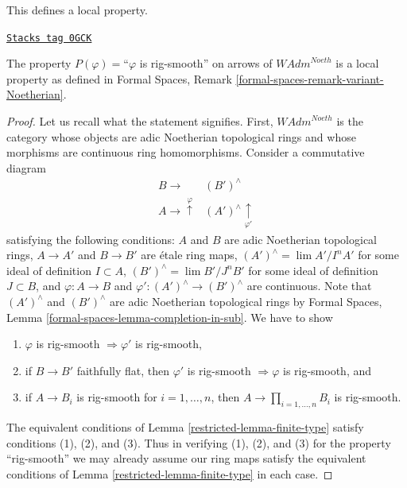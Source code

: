 This defines a local property.

\begin{lemma}
\label{restricted-lemma-rig-smooth-axioms}
\href{https://stacks.math.columbia.edu/tag/0GCK}{\texttt{Stacks tag 0GCK}}

The property $P(\varphi)=$``$\varphi$ is rig-smooth'' on arrows
of $\textit{WAdm}^{Noeth}$ is a local property as defined in
Formal Spaces, Remark \ref{formal-spaces-remark-variant-Noetherian}.
\end{lemma}

\begin{proof}

Let us recall what the statement signifies. First,
$\textit{WAdm}^{Noeth}$ is the category whose objects are
adic Noetherian topological rings and whose morphisms are
continuous ring homomorphisms. Consider a commutative diagram
$$
\begin{array}{cc}B \longrightarrow & (B')^\wedge \\ A \longrightarrow\overset{\varphi}{\uparrow} & (A')^\wedge \underset{\varphi'}{\uparrow}\end{array}
$$
satisfying the following conditions:
$A$ and $B$ are adic Noetherian topological rings,
$A \to A'$ and $B \to B'$ are \'etale ring maps,
$(A')^\wedge = \lim A'/I^nA'$ for some ideal of definition $I \subset A$,
$(B')^\wedge = \lim B'/J^nB'$ for some ideal of definition $J \subset B$, and
$\varphi : A \to B$ and $\varphi' : (A')^\wedge \to (B')^\wedge$
are continuous. Note that $(A')^\wedge$ and $(B')^\wedge$ are
adic Noetherian topological rings by
Formal Spaces, Lemma \ref{formal-spaces-lemma-completion-in-sub}.
We have to show
\begin{enumerate}
\item $\varphi$ is rig-smooth $\Rightarrow \varphi'$ is rig-smooth,
\item if $B \to B'$ faithfully flat, then $\varphi'$ is rig-smooth
$\Rightarrow \varphi$ is rig-smooth, and
\item if $A \to B_i$ is rig-smooth for $i = 1, \ldots, n$, then
$A \to \prod_{i = 1, \ldots, n} B_i$ is rig-smooth.
\end{enumerate}
The equivalent conditions of Lemma \ref{restricted-lemma-finite-type} satisfy
conditions (1), (2), and (3).
Thus in verifying (1), (2), and (3) for the property
``rig-smooth'' we may already assume our ring maps satisfy
the equivalent conditions of Lemma \ref{restricted-lemma-finite-type}
in each case.


\end{proof}
